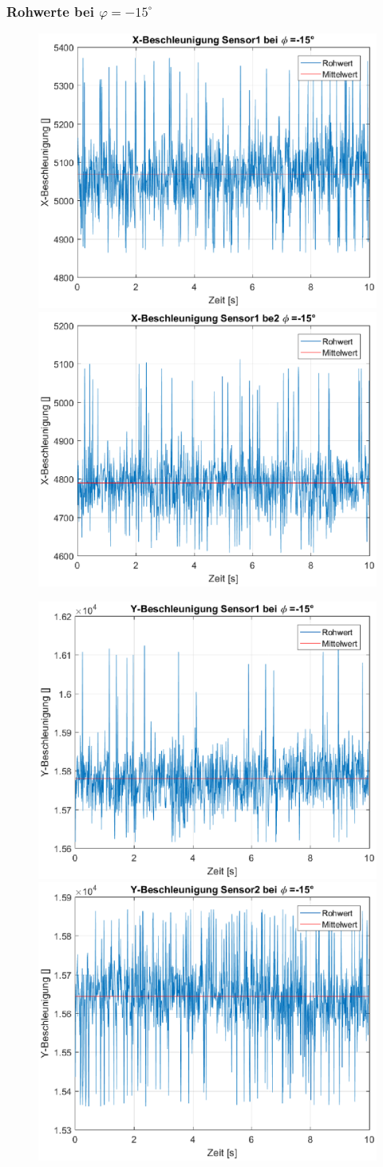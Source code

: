 \newpage
{\subsubsection{Rohwerte bei $\varphi = -15^{\circ}$}
\begin{figure}[h]
	\includegraphics[width=0.5\linewidth]{img/X1__dd___phi_-15.eps}
	\includegraphics[width=0.5\linewidth]{img/X2__dd___phi_-15.eps}
\end{figure}
\begin{figure}[h]
	\includegraphics[width=0.5\linewidth]{img/Y1__dd___phi_-15.eps}
	\includegraphics[width=0.5\linewidth]{img/Y2__dd___phi_-15.eps}
\end{figure}}

